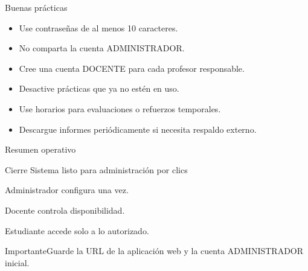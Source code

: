 \documentclass[aspectratio=169,11pt]{beamer}
\newcommand{\alertbox}[1]{\begin{block}{Importante}#1\end{block}}
\begin{document}
\begin{frame}{Buenas prácticas}
\begin{itemize}
  \item Use contraseñas de al menos 10 caracteres.
  \item No comparta la cuenta ADMINISTRADOR.
  \item Cree una cuenta DOCENTE para cada profesor responsable.
  \item Desactive prácticas que ya no estén en uso.
  \item Use horarios para evaluaciones o refuerzos temporales.
  \item Descargue informes periódicamente si necesita respaldo externo.
\end{itemize}
\end{frame}

\begin{frame}{Resumen operativo}
\centering
{}
\end{frame}

\begin{frame}{Cierre}
\centering
\Large Sistema listo para administración por clics

\vspace{.5cm}
\normalsize
Administrador configura una vez.\par
Docente controla disponibilidad.\par
Estudiante accede solo a lo autorizado.\par

\vspace{.6cm}
\alertbox{Guarde la URL de la aplicación web y la cuenta ADMINISTRADOR inicial.}
\end{frame}
\end{document}
